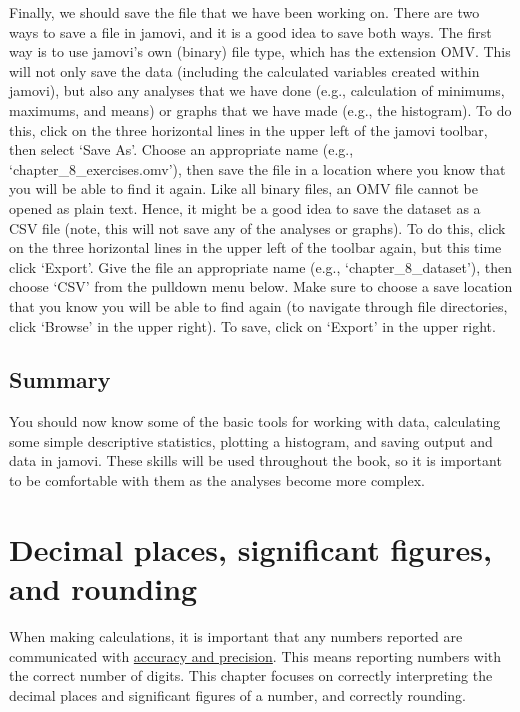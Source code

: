 \documentclass[
  openany]{krantz}
\begin{document}
Finally, we should save the file that we have been working on.
There are two ways to save a file in jamovi, and it is a good idea to save both ways.
The first way is to use jamovi's own (binary) file type, which has the extension OMV.
This will not only save the data (including the calculated variables created within jamovi), but also any analyses that we have done (e.g., calculation of minimums, maximums, and means) or graphs that we have made (e.g., the histogram).
To do this, click on the three horizontal lines in the upper left of the jamovi toolbar, then select `Save As'.
Choose an appropriate name (e.g., `chapter\_8\_exercises.omv'), then save the file in a location where you know that you will be able to find it again.
Like all binary files, an OMV file cannot be opened as plain text.
Hence, it might be a good idea to save the dataset as a CSV file (note, this will not save any of the analyses or graphs).
To do this, click on the three horizontal lines in the upper left of the toolbar again, but this time click `Export'.
Give the file an appropriate name (e.g., `chapter\_8\_dataset'), then choose `CSV' from the pulldown menu below.
Make sure to choose a save location that you know you will be able to find again (to navigate through file directories, click `Browse' in the upper right).
To save, click on `Export' in the upper right.

\hypertarget{summary-1}{%
\section{Summary}\label{summary-1}}

You should now know some of the basic tools for working with data, calculating some simple descriptive statistics, plotting a histogram, and saving output and data in jamovi.
These skills will be used throughout the book, so it is important to be comfortable with them as the analyses become more complex.

\hypertarget{Chapter_9}{%
\chapter{Decimal places, significant figures, and rounding}\label{Chapter_9}}

When making calculations, it is important that any numbers reported are communicated with \protect\hyperlink{Chapter_6}{accuracy and precision}.
This means reporting numbers with the correct number of digits.
This chapter focuses on correctly interpreting the decimal places and significant figures of a number, and correctly rounding.
\end{document}
